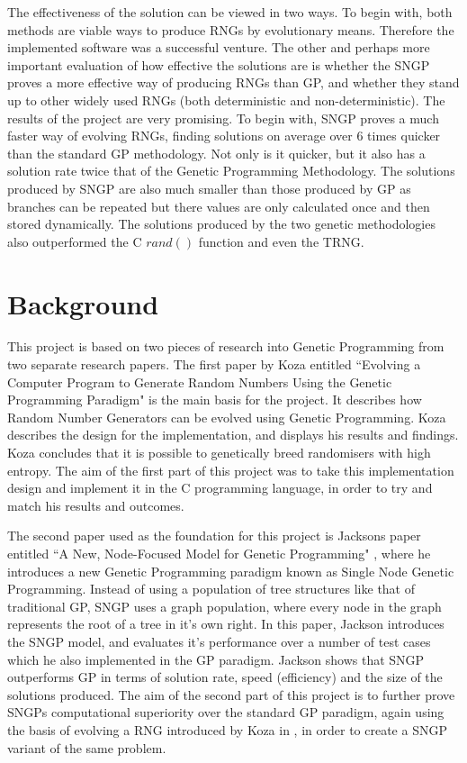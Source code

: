 \documentclass[a4paper,10.5pt]{article}
\begin{document}
The effectiveness of the solution can be viewed in two ways. To begin with, both methods are viable ways to produce RNGs by evolutionary means. Therefore the implemented software was a successful venture. The other and perhaps more important evaluation of how effective the solutions are is whether the SNGP proves a more effective way of producing RNGs than GP, and whether they stand up to other widely used RNGs (both deterministic and non-deterministic). The results of the project are very promising. To begin with, SNGP proves a much faster way of evolving RNGs, finding solutions on average over 6 times quicker than the standard GP methodology. Not only is it quicker, but it also has a solution rate twice that of the Genetic Programming Methodology. The solutions produced by SNGP are also much smaller than those produced by GP as branches can be repeated but there values are only calculated once and then stored dynamically. The solutions produced by the two genetic methodologies also outperformed the C $rand()$ function and even the TRNG.

\newpage
\section{Background}
This project is based on two pieces of research into Genetic Programming from two separate research papers. The first paper by Koza entitled ``Evolving a Computer Program to Generate Random Numbers Using the Genetic Programming Paradigm" is the main basis for the project. It describes how Random Number Generators can be evolved using Genetic Programming. Koza describes the design for the implementation, and displays his results and findings. Koza concludes that it is possible to genetically breed randomisers with high entropy. The aim of the first part of this project was to take this implementation design and implement it in the C programming language, in order to try and match his results and outcomes. 

The second paper used as the foundation for this project is Jacksons paper entitled ``A New, Node-Focused Model for Genetic Programming" \cite{jacksonsngp}, where he introduces a new Genetic Programming paradigm known as Single Node Genetic Programming. Instead of using a population of tree structures like that of traditional GP, SNGP uses a graph population, where every node in the graph represents the root of a tree in it's own right. In this paper, Jackson introduces the SNGP model, and evaluates it's performance over a number of test cases which he also implemented in the GP paradigm. Jackson shows that SNGP outperforms GP in terms of solution rate, speed (efficiency) and the size of the solutions produced. The aim of the second part of this project is to further prove SNGPs computational superiority over the standard GP paradigm, again using the basis of evolving a RNG introduced by Koza in \cite{kozarng}, in order to create a SNGP variant of the same problem.
\end{document}
